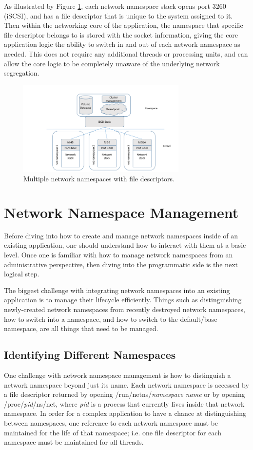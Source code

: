\documentclass[letterpaper]{article}
\begin{document}
As illustrated by Figure \ref{namespace-fds}, each network namespace stack opens port 3260 (iSCSI), and has a file descriptor that is unique to the system assigned to it. Then within the networking core of the application, the namespace that specific file descriptor belongs to is stored with the socket information, giving the core application logic the ability to switch in and out of each network namespace as needed. This does not require any additional threads or processing units, and can allow the core logic to be completely unaware of the underlying network segregation.

\begin{figure}[h]
\includegraphics[width=3.31in]{multiple-namespaces-with-fd.png}
\caption{Multiple network namespaces with file descriptors.}
\label{namespace-fds}
\end{figure}

\section{Network Namespace Management}
Before diving into how to create and manage network namespaces inside of an existing application, one should understand how to interact with them at a basic level\cite{edge2014}. Once one is familiar with how to manage network namespaces from an administrative perspective, then diving into the programmatic side is the next logical step\cite{man2016}.

The biggest challenge with integrating network namespaces into an existing application is to manage their lifecycle efficiently. Things such as distinguishing newly-created network namespaces from recently destroyed network namespaces, how to switch into a namespace, and how to switch to the default/base namespace, are all things that need to be managed.

\subsection{Identifying Different Namespaces}
One challenge with network namespace management is how to distinguish a network namespace beyond just its name. Each network namespace is accessed by a file descriptor returned by opening /run/netns/\textit{namespace name} or by opening /proc/\textit{pid}/ns/net, where \textit{pid} is a process that currently lives inside that network namespace. In order for a complex application to have a chance at distinguishing between namespaces, one reference to each network namespace must be maintained for the life of that namespace; i.e. one file descriptor for each namespace must be maintained for all threads.
\end{document}
